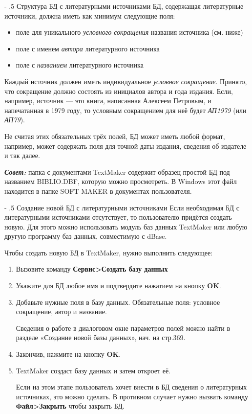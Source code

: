 ﻿\documentclass[a4paper,10pt]{article}
\makeatletter
\renewcommand\paragraph{%
   \@startsection{paragraph}{4}{0mm}%
      {-\baselineskip}%
      {.5\baselineskip}%
      {\normalfont\normalsize\bfseries}}
\makeatother
\begin{document}
\paragraph{Структура БД с литературными источниками}
БД, содержащая литературные источники, должна иметь как минимум следующие поля:
\begin{itemize}
 \item поле для уникального \textit{условного сокращения} названия источника (см. ниже)
 \item поле с именем \textit{автора} литературного источника
 \item поле с \textit{названием} литературного источника
\end{itemize}

Каждый источник должен иметь индивидуальное \textit{условное сокращение}. Принято, что сокращение должно состоять из инициалов автора и года издания. Если, например, источник — это книга, написанная Алексеем Петровым, и напечатанная в 1979 году, то условным сокращением для неё будет \textit{АП1979} (или \textit{АП79}).

Не считая этих обязательных трёх полей, БД может иметь любой формат, например, может содержать поля для точной даты издания, сведения об издателе и так далее.

\begin{mdframed}[backgroundcolor=blue!10]
\textbf{\textit{Совет:}} папка с документами TextMaker содержит образец простой БД под названием BIBLIO.DBF, которую можно просмотреть. В Windows этот файл находится в папке SOFT MAKER в документах пользователя.
\end{mdframed}

\paragraph{Создание новой БД с литературными источниками}
Если необходимая БД с литературными источниками отсутствует, то пользователю придётся создать новую. Для этого можно использовать модуль баз данных TextMaker или любую другую программу баз данных, совместимую с dBase.

Чтобы создать новую БД в TextMaker, нужно выполнить следующее:

\begin{enumerate}
 \item Вызовите команду \textbf{Сервис>Создать базу данных}
 \item Укажите для БД любое имя и подтвердите нажатием на кнопку \textbf{OK}.
 \item Добавьте нужные поля в базу данных. Обязательные поля: условное сокращение, автор и название.
 
 Сведения о работе в диалоговом окне параметров полей можно найти в разделе «Создание новой базы данных», нач. на стр.369.
 \item Закончив, нажмите на кнопку \textbf{OK}.
 \item TextMaker создаст базу данных и затем откроет её.
 
 Если на этом этапе пользователь хочет внести в БД сведения о литературных источниках, это можно сделать. В противном случает нужно вызвать команду \textbf{Файл>Закрыть} чтобы закрыть БД.
\end{enumerate}
\end{document}
